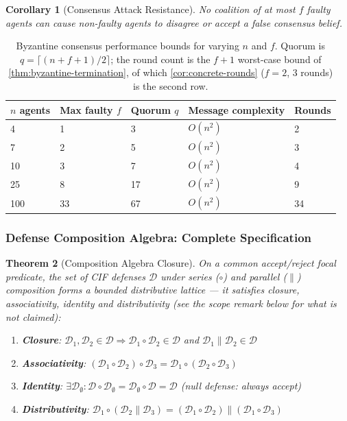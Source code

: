 \documentclass[
]{article}
\newtheorem{theorem}{Theorem}[section]
\newtheorem{corollary}[theorem]{Corollary}
\begin{document}
\begin{corollary}[Consensus Attack Resistance]
\label{cor:consensus-resistance}
No coalition of at most $f$ faulty agents can cause non-faulty agents to disagree or accept a false consensus belief.
\end{corollary}

\begin{table}[htbp]
\centering
\caption{Byzantine consensus performance bounds for varying $n$ and $f$. Quorum is $q = \lceil (n+f+1)/2 \rceil$; the round count is the $f+1$ worst-case bound of \cref{thm:byzantine-termination}, of which \cref{cor:concrete-rounds} ($f = 2$, 3 rounds) is the second row.}
\label{tab:byz-performance}
\begin{tabular}{@{}lllll@{}}
\toprule
$n$ agents & Max faulty $f$ & Quorum $q$ & Message complexity & Rounds \\
\midrule
4 & 1 & 3 & $O(n^2)$ & 2 \\
7 & 2 & 5 & $O(n^2)$ & 3 \\
10 & 3 & 7 & $O(n^2)$ & 4 \\
25 & 8 & 17 & $O(n^2)$ & 9 \\
100 & 33 & 67 & $O(n^2)$ & 34 \\
\bottomrule
\end{tabular}
\end{table}

\subsubsection{Defense Composition Algebra: Complete
Specification}\label{defense-composition-algebra-complete-specification}

\begin{theorem}[Composition Algebra Closure]
\label{thm:composition-closure}
On a common accept/reject focal predicate, the set of CIF defenses $\mathcal{D}$ under series ($\circ$) and parallel ($\parallel$) composition forms a bounded distributive lattice --- it satisfies closure, associativity, identity and distributivity (see the scope remark below for what is \emph{not} claimed):
\begin{enumerate}
\item \textbf{Closure}: $\mathcal{D}_1, \mathcal{D}_2 \in \mathcal{D} \Rightarrow \mathcal{D}_1 \circ \mathcal{D}_2 \in \mathcal{D}$ and $\mathcal{D}_1 \parallel \mathcal{D}_2 \in \mathcal{D}$
\item \textbf{Associativity}: $(\mathcal{D}_1 \circ \mathcal{D}_2) \circ \mathcal{D}_3 = \mathcal{D}_1 \circ (\mathcal{D}_2 \circ \mathcal{D}_3)$
\item \textbf{Identity}: $\exists \mathcal{D}_\emptyset: \mathcal{D} \circ \mathcal{D}_\emptyset = \mathcal{D}_\emptyset \circ \mathcal{D} = \mathcal{D}$ (null defense: always accept)
\item \textbf{Distributivity}: $\mathcal{D}_1 \circ (\mathcal{D}_2 \parallel \mathcal{D}_3) = (\mathcal{D}_1 \circ \mathcal{D}_2) \parallel (\mathcal{D}_1 \circ \mathcal{D}_3)$
\end{enumerate}
\end{theorem}
\end{document}
